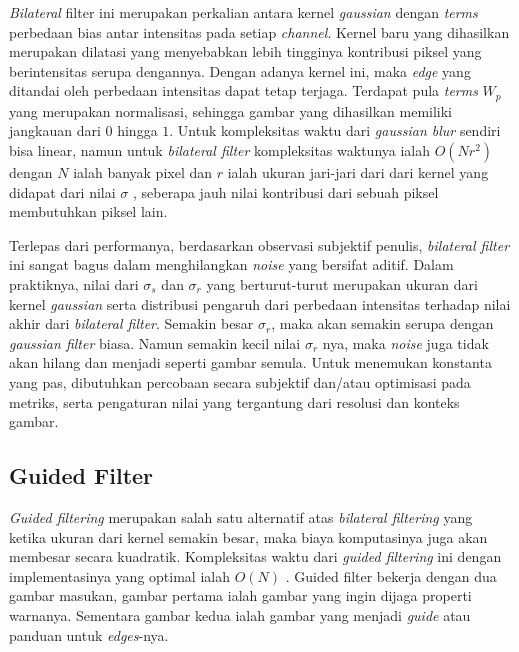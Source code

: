 \documentclass[11pt, a4paper, final]{report}
\begin{document}
\textit{Bilateral} filter ini merupakan perkalian antara kernel \textit{gaussian} dengan \textit{terms} perbedaan bias antar intensitas pada setiap \textit{channel}. Kernel baru yang dihasilkan merupakan dilatasi yang menyebabkan lebih tingginya kontribusi piksel yang berintensitas serupa dengannya. Dengan adanya kernel ini, maka \textit{edge} yang ditandai oleh perbedaan intensitas dapat tetap terjaga. Terdapat pula \textit{terms} $W_p$ yang merupakan normalisasi, sehingga gambar yang dihasilkan memiliki jangkauan dari $0$ hingga $1$. Untuk kompleksitas waktu dari \textit{gaussian blur} sendiri bisa linear, namun untuk \textit{bilateral filter} kompleksitas waktunya ialah $O(Nr^2)$ dengan $N$ ialah banyak pixel dan $r$ ialah ukuran jari-jari dari dari kernel yang didapat dari nilai $\sigma$ \cite{youtubeMaier}, seberapa jauh nilai kontribusi dari sebuah piksel membutuhkan piksel lain.

Terlepas dari performanya, berdasarkan observasi subjektif penulis, \textit{bilateral filter} ini sangat bagus dalam menghilangkan \textit{noise} yang bersifat aditif. Dalam praktiknya, nilai dari $\sigma_s$ dan $\sigma_r$ yang berturut-turut merupakan ukuran dari kernel \textit{gaussian} serta distribusi pengaruh dari perbedaan intensitas terhadap nilai akhir dari \textit{bilateral filter}. Semakin besar $\sigma_r$, maka akan semakin serupa dengan \textit{gaussian filter} biasa. Namun semakin kecil nilai $\sigma_r$ nya, maka \textit{noise} juga tidak akan hilang dan menjadi seperti gambar semula. Untuk menemukan konstanta yang pas, dibutuhkan percobaan secara subjektif dan/atau optimisasi pada metriks, serta pengaturan nilai yang tergantung dari resolusi dan konteks gambar.

\subsection{Guided Filter}

\textit{Guided filtering} merupakan salah satu alternatif atas \textit{bilateral filtering} yang ketika ukuran dari kernel semakin besar, maka biaya komputasinya juga akan membesar secara kuadratik. Kompleksitas waktu dari \textit{guided filtering} ini dengan implementasinya yang optimal ialah $O(N)$ \cite{he2015fast}. Guided filter bekerja dengan dua gambar masukan, gambar pertama ialah gambar yang ingin dijaga properti warnanya. Sementara gambar kedua ialah gambar yang menjadi \textit{guide} atau panduan untuk \textit{edges}-nya.
\end{document}

